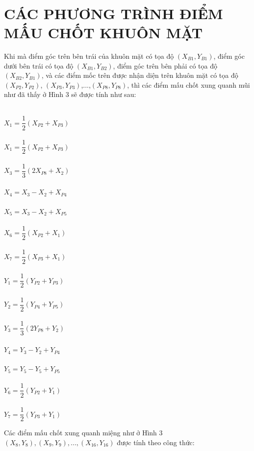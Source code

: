 \documentclass[conference]{IEEEtran}
\begin{document}



\newpage
~\\
\newpage
\appendices
\section{CÁC PHƯƠNG TRÌNH ĐIỂM MẤU CHỐT KHUÔN MẶT}
\setlength{\parskip}{1pt}
Khi mà điểm góc trên bên trái của khuôn mặt có tọa độ $(X_{B1},Y_{B1})$, điểm góc dưới bên trái có tọa độ $(X_{B1},Y_{B2})$, điểm góc trên bên phải có tọa độ $(X_{B2},Y_{B1})$, và các điểm mốc trên được nhận diện trên khuôn mặt có tọa độ $(X_{P2},Y_{P2})$, $(X_{P3},Y_{P3})$,...,$(X_{P8},Y_{P8})$, thì các điểm mấu chốt xung quanh mũi như đã thấy ở Hình 3 sẽ được tính như sau:
\begin{multicols}{2}
~\\
$X_{1}=\dfrac{1}{2}(X_{P2}+X_{P3})$\\\\
$X_{1}=\dfrac{1}{2}(X_{P2}+X_{P3})$\\\\
$X_{3}=\dfrac{1}{3}(2X_{P8}+X_{2})$\\\\
$X_4 = X_3-X_2+X_{P4}$\\\\
$X_5 = X_3-X_2+X_{P5}$\\\\
$X_{6}=\dfrac{1}{2}(X_{P2}+X_{1})$\\\\
$X_{7}=\dfrac{1}{2}(X_{P3}+X_{1})$
\columnbreak
~\\\\
$Y_{1}=\dfrac{1}{2}(Y_{P2}+Y_{P3})$\\\\
$Y_{2}=\dfrac{1}{2}(Y_{P4}+Y_{P5})$\\\\
$Y_{3}=\dfrac{1}{3}(2Y_{P8}+Y_{2})$\\\\
$Y_4 = Y_3-Y_2+Y_{P4}$\\\\
$Y_5 = Y_5-Y_5+Y_{P5}$\\\\
$Y_{6}=\dfrac{1}{2}(Y_{P2}+Y_{1})$\\\\
$Y_{7}=\dfrac{1}{2}(Y_{P3}+Y_{1})$
\end{multicols}
Các điểm mấu chốt xung quanh miệng như ở Hình 3 $(X_8,Y_8),(X_9,Y_9),...,(X_{16},Y_{16})$ được tính theo công thức:
\end{document}
